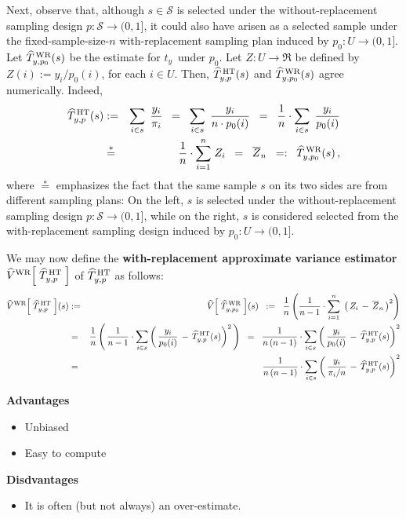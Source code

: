 Next, observe that, although \;$s \in \mathcal{S}$\; is selected under the
without-replacement sampling design \;$p : \mathcal{S} \longrightarrow (0,1]$,\;
it could also have arisen as a selected sample under the fixed-sample-size-$n$
with-replacement sampling plan induced by \;$p_{0} : U \longrightarrow (0,1]$.\;
Let \;$\widehat{T}^{\,\textnormal{WR}}_{y,p_{0}}(s)$\; be the estimate for
\;$t_{y}$\, under \;$p_{0}$.\;
Let \;$Z : U \longrightarrow \Re$\; be defined by
\;$Z(i) := y_{i} / p_{0}(i)$,\; for each \;$i \in U$.\;
Then,
\;$\widehat{T}^{\,\textnormal{HT}}_{y,p}(s)$\; and
\;$\widehat{T}^{\,\textnormal{WR}}_{y,p_{0}}(s)$\;
agree numerically.
Indeed,
\begin{eqnarray*}
\widehat{T}^{\,\textnormal{HT}}_{y,p}(s)
& := &
	\underset{i \in s}{\sum}\;\, \dfrac{y_{i}}{\pi_{i}}
\;\; = \;\;
	\underset{i \in s}{\sum}\;\, \dfrac{y_{i}}{n \cdot p_{0}(i)}
\;\; = \;\;
	\dfrac{1}{n}\cdot \underset{i \in s}{\sum}\;\, \dfrac{y_{i}}{p_{0}(i)}
\\
& \overset{*}{=} &
	\dfrac{1}{n}\cdot \overset{n}{\underset{i = 1}{\sum}}\; Z_{i}
\;\; = \;\;
	\overline{Z}_{n}
\;\; =: \;\;
	\widehat{T}^{\,\textnormal{WR}}_{y,p_{0}}(s)\,,
\end{eqnarray*}
where \;$\overset{*}{=}$\; emphasizes the fact that the same sample \;$s$\;
on its two sides are from different sampling plans:
On the left, \;$s$\; is selected under the without-replacement sampling design
$p : \mathcal{S} \longrightarrow (0,1]$, while on the right,
\;$s$\; is considered selected from the with-replacement sampling design
induced by \;$p_{0} : U \longrightarrow (0,1]$.

\vskip 0.5cm
\noindent
We may now define the
\textbf{with-replacement approximate variance estimator}
\;$\widehat{V}^{\textnormal{WR}}\!\left[\;\widehat{T}^{\,\textnormal{HT}}_{y,p}\;\right]$\;
of \;$\widehat{T}^{\,\textnormal{HT}}_{y,p}$\; as follows:
\begin{eqnarray*}
\widehat{V}^{\textnormal{WR}}\!\left[\;\widehat{T}^{\,\textnormal{HT}}_{y,p}\;\right]\!(s)
& := &
	\widehat{V}\!\left[\;\widehat{T}^{\,\textnormal{WR}}_{y,p_{0}}\;\right]\!(s)
\;\; := \;\;
	\dfrac{1}{n}\left(
		\dfrac{1}{n-1}\cdot\overset{n}{\underset{i=1}{\sum}}\;
		\left(\,Z_{i}\,-\,\overline{Z}_{n}\,\right)^{2}
		\right)
\\
& = &
	\dfrac{1}{n}\left(\,
		\dfrac{1}{n-1}\cdot\underset{i \in s}{\sum}
		\left(\,\dfrac{y_{i}}{p_{0}(i)}\,-\,\widehat{T}^{\,\textnormal{HT}}_{y,p}(s)\right)^{2}
		\,\right)
\;\; = \;\;
	\dfrac{1}{n\,(n-1)}\cdot\underset{i \in s}{\sum}
		\left(\,
		\dfrac{y_{i}}{p_{0}(i)}\,-\,\widehat{T}^{\,\textnormal{HT}}_{y,p}(s)
		\right)^{2}
\\
& = &
	\dfrac{1}{n\,(n-1)}\cdot\underset{i \in s}{\sum}
		\left(\,
		\dfrac{y_{i}}{\pi_{i}/n}\,-\,\widehat{T}^{\,\textnormal{HT}}_{y,p}(s)
		\right)^{2}
\end{eqnarray*}

\vskip 0.5cm
\noindent
\textbf{Advantages}
\begin{itemize}
\item
	Unbiased
\item
	Easy to compute
\end{itemize}

\vskip 0.5cm
\noindent
\textbf{Disdvantages}
\begin{itemize}
\item
	It is often (but not always) an over-estimate.
\end{itemize}

